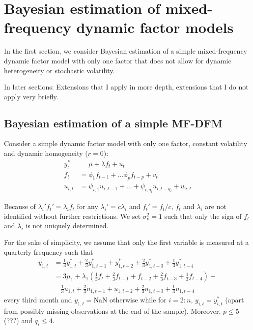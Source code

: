 \chapter{Bayesian estimation of mixed-frequency dynamic factor models}\label{sec:bayes}

In the first section, we consider Bayesian estimation of a simple mixed-frequency dynamic factor model with only one factor that does not allow for dynamic heterogeneity or stochastic volatility.

In later sections: Extensions that I apply in more depth, extensions that I do not apply very briefly. 

\section{Bayesian estimation of a simple MF-DFM}
\label{sec:est_simple}

Consider a simple dynamic factor model with only one factor, constant volatility and dynamic homogeneity ($r=0$): 
\begin{align}
y^*_t &= \mu + \lambda f_{t} + u_{t}     			  \label{eq:dfm_obs} \\
f_t &= \phi_1 f_{t-1} + \dots \phi_p f_{t-p} + v_t    \label{eq:dfm_trans_f}   \\
u_{i,t} &= \psi_{i,1} u_{i,t-1} + \dots + \psi_{i,q_i} u_{i,t-q_i} +  w_{i,t} 					   \label{eq:dfm_trans_u}
\end{align}

Because of $\lambda_i' f_t' = \lambda_i f_t$ for any $\lambda_i' = c \lambda_i$ and $f_t' = f_t/c$, $f_t$ and $\lambda_i$ are not identified without further restrictions. We set $\sigma^2_v=1$ such that only the sign of $f_t$ and $\lambda_i$ is not uniquely determined.

For the sake of simplicity, we assume that only the first variable is measured at a quarterly frequency such that
\begin{align}
y_{1,t} &=  \frac{1}{3} y^*_{1,t} + \frac{2}{3} y^*_{1,t-1} + y^*_{1,t-2} + \frac{2}{3} y^*_{1,t-3} + \frac{1}{3} y^*_{1,t-4} \\
&= 3\mu_1 + \lambda_1 \left(\frac{1}{3} f_{t} + \frac{2}{3} f_{t-1} +  f_{t-2} + \frac{2}{3} f_{t-3} + \frac{1}{3} f_{t-4} \right) + \\
& \quad \frac{1}{3} u_{1,t} + \frac{2}{3} u_{1,t-1} +  u_{1,t-2} + \frac{2}{3} u_{1,t-3} + \frac{1}{3} u_{1,t-4}
\end{align}
every third month and $y_{1,t} = \mathrm{NaN}$ otherwise while for $i=2:n$, $y_{i,t} = y^*_{i,t}$ (apart from possibly missing observations at the end of the sample). Moreover, $p \le 5$ (???) and $q_i \le 4$.\\


